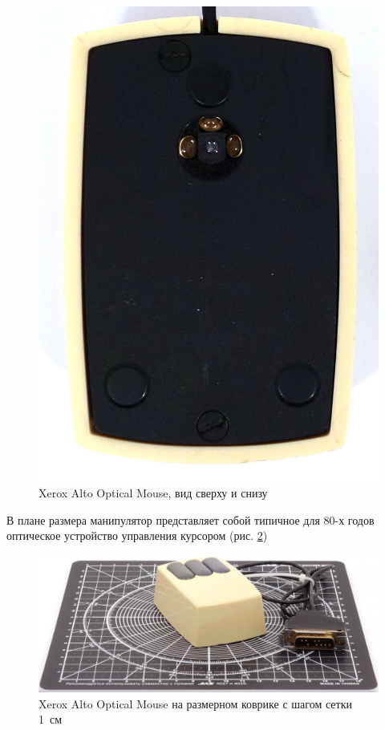 \documentclass[11pt, a4paper]{article}
\begin{document}
\begin{figure}[h]
    \includegraphics[scale=0.4]{1981_xerox_alto_mouse/bottom_30.jpg}
    \caption{Xerox Alto Optical Mouse, вид сверху и снизу}
    \label{NecAltoTopAndBottom}
\end{figure}

В плане размера манипулятор представляет собой типичное для 80-х годов оптическое устройство управления курсором (рис. \ref{fig:NecAltoSize})

\begin{figure}[h]
    \centering
    \includegraphics[scale=0.4]{1981_xerox_alto_mouse/size_15.jpg}
    \caption{Xerox Alto Optical Mouse на размерном коврике с шагом сетки 1~см}
    \label{fig:NecAltoSize}
\end{figure}
\end{document}
